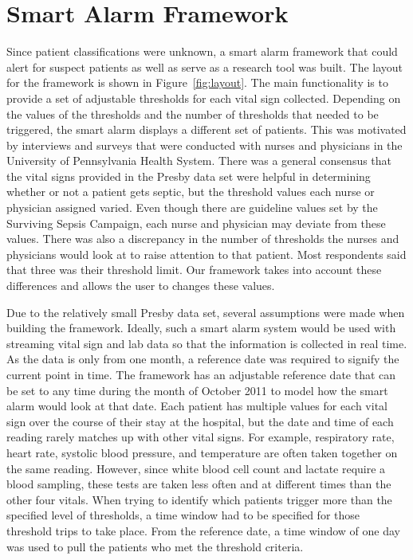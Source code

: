 \documentclass{sig-alternate}
\begin{document}
\vspace{10pt}
\section{Smart Alarm Framework}
\vspace{10pt}
\label{sec:framework}

Since patient classifications were unknown, a smart alarm framework that could alert for suspect patients as well as serve as a research tool was built.  The layout for the framework is shown in Figure~\ref{fig:layout}.  The main functionality is to provide a set of adjustable thresholds for each vital sign collected.  Depending on the values of the thresholds and the number of thresholds that needed to be triggered, the smart alarm displays a different set of patients.  This was motivated by interviews and surveys that were conducted with nurses and physicians in the University of Pennsylvania Health System.  There was a general consensus that the vital signs provided in the Presby data set were helpful in determining whether or not a patient gets septic, but the threshold values each nurse or physician assigned varied.  Even though there are guideline values set by the Surviving Sepsis Campaign, each nurse and physician may deviate from these values.  There was also a discrepancy in the number of thresholds the nurses and physicians would look at to raise attention to that patient.  Most respondents said that three was their threshold limit.  Our framework takes into account these differences and allows the user to changes these values.

Due to the relatively small Presby data set, several assumptions were made when building the framework.  Ideally, such a smart alarm system would be used with streaming vital sign and lab data so that the information is collected in real time.  As the data is only from one month, a reference date was required to signify the current point in time.  The framework has an adjustable reference date that can be set to any time during the month of October 2011 to model how the smart alarm would look at that date.  Each patient has multiple values for each vital sign over the course of their stay at the hospital, but the date and time of each reading rarely matches up with other vital signs.  For example, respiratory rate, heart rate, systolic blood pressure, and temperature are often taken together on the same reading.  However, since white blood cell count and lactate require a blood sampling, these tests are taken less often and at different times than the other four vitals.  When trying to identify which patients trigger more than the specified level of thresholds, a time window had to be specified for those threshold trips to take place.  From the reference date, a time window of one day was used to pull the patients who met the threshold criteria.  
\end{document}
